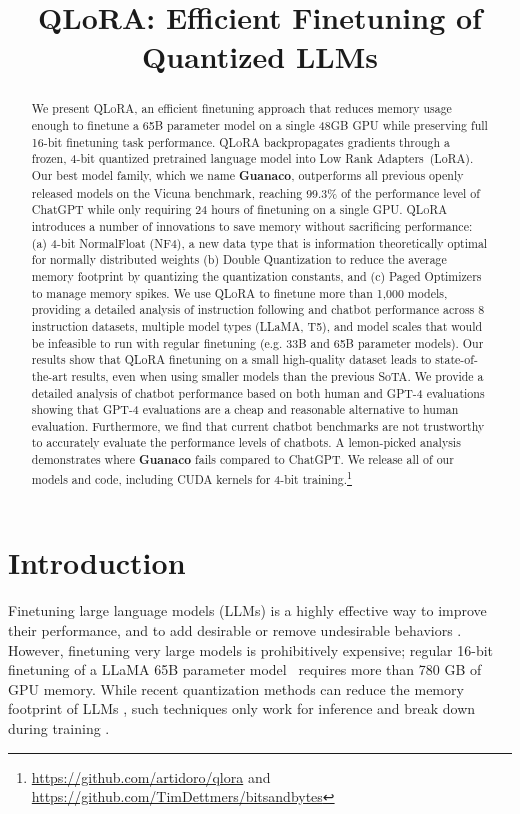 \title{QLoRA: Efficient Finetuning of Quantized LLMs}

\begin{abstract}
We present \textsc{QLoRA}, an efficient finetuning approach that reduces memory usage enough to finetune a 65B parameter model on a single 48GB GPU while preserving full 16-bit finetuning task performance. \textsc{QLoRA} backpropagates gradients through a frozen, 4-bit quantized pretrained language model into Low Rank Adapters~(LoRA). Our best model family, which we name \textbf{Guanaco}, outperforms all previous openly released models on the Vicuna benchmark, reaching 99.3\% of the performance level of ChatGPT while only requiring 24 hours of finetuning on a single GPU. \textsc{QLoRA} introduces a number of innovations to save memory without sacrificing performance: (a) 4-bit NormalFloat (NF4), a new data type that is information theoretically optimal for normally distributed weights (b) Double Quantization to reduce the average memory footprint by quantizing the quantization constants, and (c) Paged Optimizers to manage memory spikes. We use \textsc{QLoRA} to finetune more than 1,000 models, providing a detailed analysis of instruction following and chatbot performance across 8 instruction datasets, multiple model types (LLaMA, T5), and model scales that would be infeasible to run with regular finetuning (e.g. 33B and 65B parameter models). Our results show that QLoRA finetuning on a small high-quality dataset leads to state-of-the-art results, even when using smaller models than the previous SoTA. We provide a detailed analysis of chatbot performance based on both human and GPT-4 evaluations showing that GPT-4 evaluations are a cheap and reasonable alternative to human evaluation. Furthermore, we find that current chatbot benchmarks are not trustworthy to accurately evaluate the performance levels of chatbots. A lemon-picked analysis demonstrates where \textbf{Guanaco} fails compared to ChatGPT. We release all of our models and code, including CUDA kernels for 4-bit training.\footnote{\url{https://github.com/artidoro/qlora} and \url{https://github.com/TimDettmers/bitsandbytes}}
\end{abstract}

\section{Introduction}

Finetuning large language models (LLMs) is a highly effective way to improve their performance, \citep{min2021metaicl, wei2021finetuned, ouyang2022training, wang2022super, wang2022self, liu2022few} and to add desirable or remove undesirable behaviors \citep{ouyang2022training,askell2021general,bai2022training}. However, finetuning very large models is prohibitively expensive; regular 16-bit finetuning of a LLaMA 65B parameter model~\citep{touvron2023llama} requires more than 780 GB of GPU memory. While recent quantization methods can reduce the memory footprint of LLMs \citep{dettmers2022llm, dettmers2022case, frantar2022gptq, xiao2022smoothquant}, such techniques only work for inference and break down during training \citep{wortsman2023stable}. 

